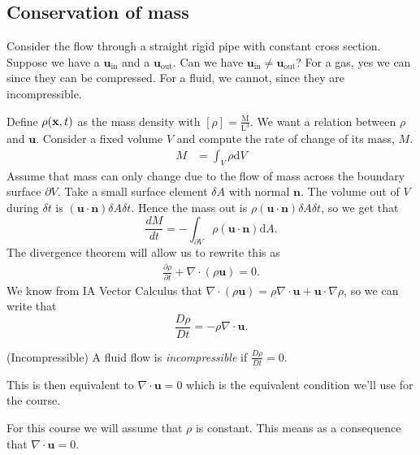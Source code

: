 \documentclass{article}
\begin{document}
\subsection{Conservation of mass}
Consider the flow through a straight rigid pipe with constant cross section. Suppose we have a $ \mathbf u_{\text{in}} $ and a $ \mathbf u_{\text{out}} $. Can we have $ \mathbf u_{\text{in}}\ne \mathbf u_{\text{out}} $? For a gas, yes we can since they can be compressed. For a fluid, we cannot, since they are incompressible.\par
Define $ \rho(\mathbf{x},t) $ as the mass density with $ [\rho]=\frac{\text{M}}{ \text{L}^3 }$. We want a relation between $ \rho $ and $ \mathbf u $. Consider a fixed volume $ V $ and compute the rate of change of its mass, $ M $.
\begin{align*}
	M &=\int_V\rho\mathrm dV
\end{align*}
Assume that mass can only change due to the flow of mass across the boundary surface $ \partial V $. Take a small surface element $ \delta A $ with normal $ \mathbf n $. The volume out of $ V $ during $ \delta t $ is $ (\mathbf u \cdot \mathbf n)\delta A\delta t $. Hence the mass out is $ \rho(\mathbf u\cdot\mathbf n)\delta A\delta t $, so we get that
\[
	\frac{dM}{dt}=-\int_{\partial V}\rho(\mathbf u\cdot \mathbf n)\mathrm dA.
\]
The divergence theorem will allow us to rewrite this as
\begin{align*}
	\frac{\partial \rho}{\partial t}+\nabla\cdot(\rho \mathbf u) = 0.
\end{align*}
We know from IA Vector Calculus that $ \nabla\cdot(\rho\mathbf u) = \rho\nabla\cdot \mathbf u +\mathbf u \cdot\nabla\rho $, so we can write that
\[
	\frac{D\rho}{Dt}=-\rho\nabla\cdot \mathbf u.
\]
\begin{definition}
	(Incompressible) A fluid flow is \textit{incompressible} if $ \frac{D\rho}{Dt}=0 $.
\end{definition}
This is then equivalent to $ \nabla\cdot\mathbf u =0 $ which is the equivalent condition we'll use for the course.\par
For this course we will assume that $ \rho $ is constant. This means as a consequence that $ \nabla\cdot\mathbf u =0 $.
\end{document}
